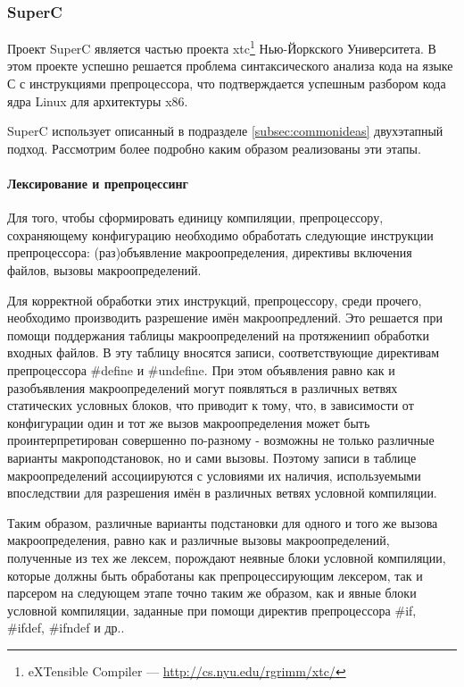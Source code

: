 \subsubsection{SuperC}

Проект SuperC является частью проекта xtc\footnote{eXTensible Compiler --- \url{http://cs.nyu.edu/rgrimm/xtc/}} Нью-Йоркского Университета. В этом проекте успешно решается проблема синтаксического анализа кода на языке С с инструкциями препроцессора, что подтверждается успешным разбором кода ядра Linux для архитектуры x86.

SuperC использует описанный в подразделе \ref{subsec:commonideas} двухэтапный подход. Рассмотрим более подробно каким образом реализованы эти этапы.

\paragraph{Лексирование и препроцессинг}
\label{lexingandpreprocessing}

Для того, чтобы сформировать единицу компиляции, препроцессору, сохраняющему конфигурацию необходимо обработать следующие инструкции препроцессора: (раз)объявление макроопределения, директивы включения файлов, вызовы макроопределений.

Для корректной обработки этих инструкций, препроцессору, среди прочего, необходимо производить разрешение имён макроопредлений. Это решается при помощи поддержания таблицы макроопределений на протяжениип обработки входных файлов. В эту таблицу вносятся записи, соответствующие директивам препроцессора \#define и \#undefine. При этом объявления равно как и разобъявления макроопределений могут появляться в различных ветвях статических условных блоков, что приводит к тому, что, в зависимости от конфигурации один и тот же вызов макроопределения может быть проинтерпретирован совершенно по-разному - возможны не только различные варианты макроподстановок, но и сами вызовы.  Поэтому записи в таблице макроопределений ассоциируются с условиями их наличия, используемыми впоследствии для разрешения имён в различных ветвях условной компиляции.

Таким образом, различные варианты подстановки для одного и того же вызова макроопределения, равно как и различные вызовы макроопределений, полученные из тех же лексем, порождают неявные блоки условной компиляции, которые должны быть обработаны как препроцессирующим лексером, так и парсером на следующем этапе точно таким же образом, как и явные блоки условной компиляции, заданные при помощи директив препроцессора \#if, \#ifdef, \#ifndef и др..

